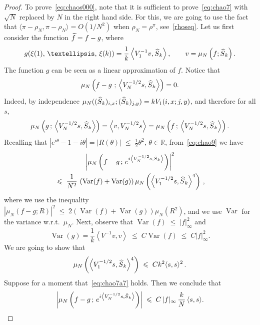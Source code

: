 \documentclass[10pt,a4paper]{article}
\renewcommand{\leq}{\;\leqslant\;}
\newcommand{\rhoN}{\rho^{\pi}}
\newcommand{\scalar}[2]{\langle #1, #2\rangle}
\DeclareMathOperator{\var}{Var}
\newcommand{\bbR}{\mathbb{R}}
\let\r=\rho
\let\oldtilde\tilde
\renewcommand*{\tilde}[1]{\mathchoice{\widetilde{#1}}{\widetilde{#1}}{\oldtilde{#1}}{\oldtilde{#1}}}
\let\oldhat\hat
\renewcommand*{\hat}[1]{\mathchoice{\widehat{#1}}{\widehat{#1}}{\oldhat{#1}}{\oldhat{#1}}}
\begin{document}
\begin{proof}
To prove~\eqref{eq:chaos000}, note that it is sufficient to prove~\eqref{eq:chao7} with $\sqrt N$ replaced by $N$ in the right hand side. For this, we are going to use the fact that $\scalar{\pi-\r_N}{\pi-\r_N}=O(1/N^2)$ when $\r_N=\rhoN$, see~\eqref{rhoseq}. Let us first consider the function $\tilde f = f-g$, where
\begin{align}\label{eq:chao8}
g(\xi(1),\,\dots,\,\xi(k))=\frac1k\left\langle V_1^{-1}v,\hat S_k\right\rangle,\qquad v = \mu_N\left(f;\hat S_k\right).
\end{align}
The function $g$ can be seen as a linear approximation of $f$. Notice that
\begin{align}\label{eq:chao9}
\mu_N\left(f-g\, \,;\,\left\langle V_N^{-1/2} s,\hat S_k\right\rangle\right)=0.
\end{align}
Indeed, by independence $\mu_N((\hat S_k)_{i,x};(\hat S_k)_{j,y}) = k V_1(i,x;j,y) $, and therefore for all $s$,
\begin{align}\label{eq:chao10}
\mu_N\left(g \,;\,\left\langle V_N^{-1/2} s,\hat S_k\right\rangle\right) = \left\langle v,V_N^{-1/2} s\right\rangle =\mu_N\left(f\,;\,\left\langle V_N^{-1/2} s,\hat S_k\right\rangle\right).
\end{align}
Recalling that $|e^{i\theta}-1-i\theta|=|R(\theta)|\leq \frac12\theta^2$, $\theta\in\bbR$, from~\eqref{eq:chao9} we have
\begin{multline}\label{eq:chao71x}
\left|\mu_N\left(f-g\,; \,e^{i\left\langle V_N^{-1/2} s,\hat S_k\right\rangle}
\right)\right|^2\\
\leq \frac1{N^2}\,\left(\var(f) + \var(g)\right)\mu_N\left(\left\langle V_1^{-1/2} s,\hat S_k\right\rangle^4\right)\,,
\end{multline}
where we use the inequality $|\mu_N(f-g;R)|^2\leq 2(\var(f) + \var(g))\mu_N(R^2)$, and we use $\var$ for the variance w.r.t.\ $\mu_N$. Next, observe that $\var(f)\leq |f|_\infty^2$ and
\[
\var(g) = \frac1k \left\langle V^{-1}v,v\right\rangle \leq C \var(f) \leq C |f|_\infty^2.
\]
We are going to show that
\begin{align}\label{eq:chao7a7}
\mu_N\left(\left\langle V_1^{-1/2} s,\hat S_k\right\rangle^4\right)
\leq C k^2\scalar{s}{s}^2\,.
\end{align}
Suppose for a moment that~\eqref{eq:chao7a7} holds. Then we conclude that
\begin{align}\label{eq:chao7a}
\left|\mu_N\left(f-g\,; \,e^{i\left\langle V_N^{-1/2} s,\hat S_k\right\rangle}\right)\right|\leq C \,|f|_\infty\,\frac{k}{ N}\,\scalar{s}{s}.
\end{align}

\end{proof}
\end{document}
